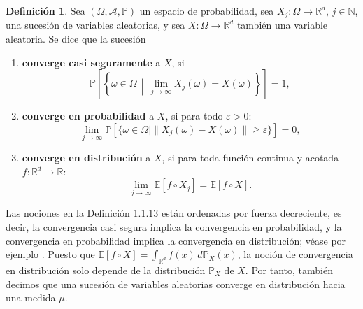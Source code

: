 \documentclass[11pt]{report}
\newenvironment{tcolorbox}[1][]{\par\medskip\noindent\ignorespaces}{\par\medskip}
\theoremstyle{definition}
\newtheorem{definicion}{Definición}[section]
\theoremstyle{plain}
\numberwithin{equation}{section}
\begin{document}
\begin{tcolorbox}[colback=blue!8, colframe=blue!8, boxrule=0pt]
\begin{definicion}
Sea \((\Omega,\mathcal{A},\mathbb{P})\) un espacio de probabilidad, sea \(X_j:\Omega\to\mathbb{R}^d\), \(j\in\mathbb{N}\), una sucesión de variables aleatorias, y sea \(X:\Omega\to\mathbb{R}^d\) también una variable aleatoria. Se dice que la sucesión

\begin{enumerate}
    \item[(i)] \textbf{converge casi seguramente} a \(X\), si
    \begin{equation*}
        \mathbb{P}
        \left[
            \left\{
                \omega\in\Omega
                \,\middle|\,
                \lim_{j\to\infty}X_j(\omega)=X(\omega)
            \right\}
        \right]
        =
        1,
    \end{equation*}

    \item[(ii)] \textbf{converge en probabilidad} a \(X\), si para todo \(\varepsilon>0\):
    \begin{equation*}
        \lim_{j\to\infty}
        \mathbb{P}
        \left[
            \{\omega\in\Omega\mid \|X_j(\omega)-X(\omega)\|\geq\varepsilon\}
        \right]
        =
        0,
    \end{equation*}

    \item[(iii)] \textbf{converge en distribución} a \(X\), si para toda función continua y acotada \(f:\mathbb{R}^d\to\mathbb{R}\):
    \begin{equation*}
        \lim_{j\to\infty}\mathbb{E}[f\circ X_j]
        =
        \mathbb{E}[f\circ X].
    \end{equation*}
\end{enumerate}
\end{definicion}
\end{tcolorbox}

Las nociones en la Definición 1.1.13 están ordenadas por fuerza decreciente, es decir, la convergencia casi segura implica la convergencia en probabilidad, y la convergencia en probabilidad implica la convergencia en distribución; véase por ejemplo \cite[Capítulo 13]{klenke-2014}. Puesto que \(\mathbb{E}[f\circ X]=\int_{\mathbb{R}^d} f(x)\,d\mathbb{P}_X(x)\), la noción de convergencia en distribución solo depende de la distribución \(\mathbb{P}_X\) de \(X\). Por tanto, también decimos que una sucesión de variables aleatorias converge en distribución hacia una medida \(\mu\).
\end{document}
